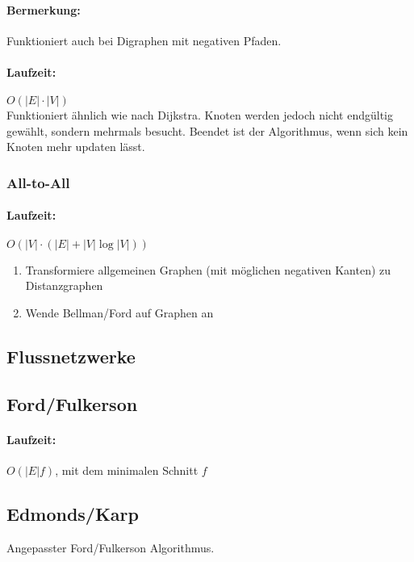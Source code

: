 \documentclass[11pt]{article}
\begin{document}
\paragraph{Bermerkung:} Funktioniert auch bei Digraphen mit negativen Pfaden.

\paragraph{Laufzeit:} $O(|E|\cdot|V|)$ \\

Funktioniert ähnlich wie nach Dijkstra. Knoten werden jedoch nicht endgültig gewählt, sondern mehrmals besucht. Beendet ist der Algorithmus, wenn sich kein Knoten mehr updaten lässt.

\subsubsection{All-to-All}

\paragraph{Laufzeit:} $O(|V|\cdot (|E| + |V|\log|V|))$

\begin{enumerate}[noitemsep]
	\item Transformiere allgemeinen Graphen (mit möglichen negativen Kanten) zu Distanzgraphen
	\item Wende Bellman/Ford auf Graphen an
\end{enumerate}

\subsection{Flussnetzwerke}

\subsection{Ford/Fulkerson}

\paragraph{Laufzeit:} $O(|E|f)$, mit dem minimalen Schnitt $f$ 

\subsection{Edmonds/Karp}

Angepasster Ford/Fulkerson Algorithmus.
\end{document}
